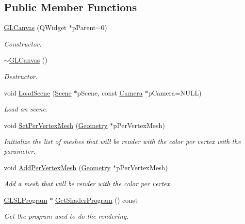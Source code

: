 \subsection*{Public Member Functions}
\begin{DoxyCompactItemize}
\item 
\hyperlink{class_g_l_canvas_a990c03d907317cf7c779c732879a5e09}{G\+L\+Canvas} (Q\+Widget $\ast$p\+Parent=0)
\begin{DoxyCompactList}\small\item\em Constructor. \end{DoxyCompactList}\item 
\hyperlink{class_g_l_canvas_ae0a190f77989c1ada0a2c18e014fe793}{$\sim$\+G\+L\+Canvas} ()
\begin{DoxyCompactList}\small\item\em Destructor. \end{DoxyCompactList}\item 
void \hyperlink{class_g_l_canvas_a4f0ed55a666acb49e62614ac852dbbd6}{Load\+Scene} (\hyperlink{class_scene}{Scene} $\ast$p\+Scene, const \hyperlink{class_camera}{Camera} $\ast$p\+Camera=N\+U\+L\+L)
\begin{DoxyCompactList}\small\item\em Load an scene. \end{DoxyCompactList}\item 
void \hyperlink{class_g_l_canvas_ad971519caad475d6e808a643a9cafa9e}{Set\+Per\+Vertex\+Mesh} (\hyperlink{class_geometry}{Geometry} $\ast$p\+Per\+Vertex\+Mesh)
\begin{DoxyCompactList}\small\item\em Initialize the list of meshes that will be render with the color per vertex with the parameter. \end{DoxyCompactList}\item 
void \hyperlink{class_g_l_canvas_a2d000cfd65bf699e1c518ad429cc5e1d}{Add\+Per\+Vertex\+Mesh} (\hyperlink{class_geometry}{Geometry} $\ast$p\+Per\+Vertex\+Mesh)
\begin{DoxyCompactList}\small\item\em Add a mesh that will be render with the color per vertex. \end{DoxyCompactList}\item 
\hyperlink{class_g_l_s_l_program}{G\+L\+S\+L\+Program} $\ast$ \hyperlink{class_g_l_canvas_a1c704fb20881551f24af638a12eebcdb}{Get\+Shader\+Program} () const 
\begin{DoxyCompactList}\small\item\em Get the program used to do the rendering. \end{DoxyCompactList}\item 

\end{DoxyCompactItemize}
